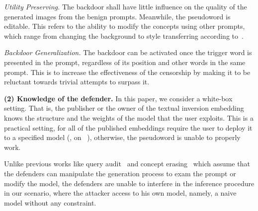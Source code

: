 \begin{packeditemize}
    \item \textit{Utility Preserving.} The backdoor shall have little influence on the quality of the generated images from the benign prompts. Meanwhile, the pseudoword is editable. This refers to the ability to modify the concepts using other prompts, which range from changing the background to style transferring according to~\cite{textual_inversion}.

    \item  \textit{Backdoor Generalization.} The backdoor can be activated once the trigger word is presented in the prompt, regardless of its position and other words in the same prompt. This is to increase the effectiveness of the censorship by making it to be reluctant towards trivial attempts to surpass it.
\end{packeditemize}

\noindent \textbf{(2) Knowledge of the defender.}
In this paper, we consider a white-box setting. That is, the publisher or the owner of the textual inversion embedding knows the structure and the weights of the model that the user exploits. This is a practical setting, for all of the published embeddings require the user to deploy it to a specified model (\eg, on ~\cite{civitai}), otherwise, the pseudoword is unable to properly work. 


Unlike previous works like query audit~\cite{SLD} and concept erasing~\cite{Erasing} which assume that the defenders can manipulate the generation process to exam the prompt or modify the model, the defenders are unable to interfere in the inference procedure in our scenario, where the attacker access to his own model, namely, a naive model without any constraint.


